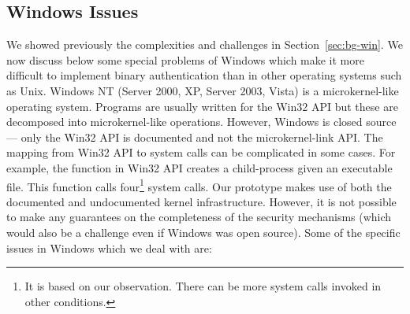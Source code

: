 \subsection{Windows Issues}
\label{sec:binauth-windows}

We showed previously the complexities and challenges in Section~\ref{sec:bg-win}.
We now discuss below some special problems of
Windows which make it more difficult to implement binary authentication
than in other operating systems such as Unix.
Windows NT (Server 2000, XP, Server 2003, Vista) is a microkernel-like
operating system. 
Programs are usually written for the Win32 API but these are
decomposed into microkernel-like operations. 
However, Windows is closed source --- only the Win32 API is documented
and not the microkernel-link API.
The mapping from Win32 API to system calls can be complicated in some
cases.
For example, the  function in Win32 API creates
a child-process given an executable file.
This function calls four\footnote{
It is based on our observation.
There can be more system calls invoked in other conditions.
} system calls.
Our prototype makes use of both the documented and undocumented
kernel infrastructure. However, it is not possible to make any guarantees
on the completeness of the security mechanisms
(which would also be a challenge even if Windows was open source).
Some of the specific issues in Windows which we deal with are:
